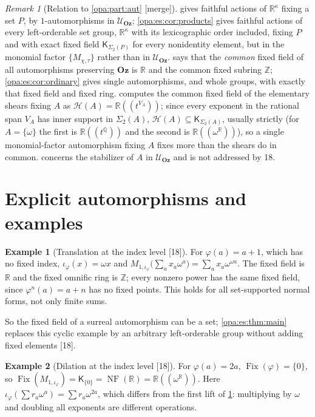 \documentclass[11pt,oneside]{article}
\numberwithin{equation}{section}
\theoremstyle{definition}
\newtheorem{example}[example]{Example}
\theoremstyle{remark}
\newtheorem{remark}[remark]{Remark}
\newcommand{\Oz}{\mathbf{Oz}}
\newcommand{\R}{\mathbb R}
\newcommand{\Q}{\mathbb Q}
\newcommand{\Z}{\mathbb Z}
\newcommand{\UU}{\mathcal U}
\newcommand{\HH}{\mathcal H}
\newcommand{\Fix}{\operatorname{Fix}}
\newcommand{\Hahn}[2]{#1((t^{#2}))}
\newcommand{\src}[1]{\textup{\textsf{\small[#1]}}}
\newcommand{\mergetag}{\textup{\textsf{\small[merge]}}}
\newcommand{\NF}{\operatorname{NF}}
\begin{document}
\begin{remark}[Relation to \cref{opa:part:aut} \mergetag]\label{opa:es:rem:relation}
 gives faithful actions of $\R^\kappa$ fixing a set $P$, by $1$-automorphisms in $\UU_\Oz$; \cref{opa:es:cor:products}
gives faithful actions of every left-orderable set group, $\R^\kappa$ with its lexicographic order included, fixing $P$ and with exact
fixed field $\mathsf K_{\Sigma_2(P)}$ for every nonidentity element, but in the monomial factor $\{M_{\chi,\tau}\}$ rather than in $\UU_\Oz$.
 says that the \emph{common} fixed field of all automorphisms preserving $\Oz$ is $\R$ and the common fixed subring $\Z$;
\cref{opa:es:cor:ordinary} gives single automorphisms, and whole groups, with exactly that fixed field and fixed ring. 
computes the common fixed field of the elementary shears fixing $A$ as $\HH(A)=\Hahn\R{V_A}$; since every exponent in the rational span
$V_A$ has inner support in $\Sigma_2(A)$, $\HH(A)\subseteq\mathsf K_{\Sigma_2(A)}$, usually strictly (for $A=\{\omega\}$ the first is
$\Hahn\R\Q$ and the second is $\R((\omega^\R))$), so a single monomial-factor automorphism fixing $A$ fixes more than the shears do in
common.  concerns the stabilizer of $A$ in $\UU_\Oz$ and is not addressed by 18.
\end{remark}

\section{Explicit automorphisms and examples}\label{opa:es:sec:examples}

\begin{example}[Translation at the index level \src{18}]\label{opa:es:ex:translation}
For $\varphi(a)=a+1$, which has no fixed index, $\iota_\varphi(x)=\omega x$ and
$M_{1,\iota_\varphi}\bigl(\sum_ax_a\omega^a\bigr)=\sum_ax_a\omega^{\omega a}$. The fixed field is $\R$ and the fixed omnific ring is $\Z$; every
nonzero power has the same fixed field, since $\varphi^n(a)=a+n$ has no fixed points. This holds for all set-supported normal forms, not
only finite sums.
\end{example}

So the fixed field of a surreal automorphism can be a set; \cref{opa:es:thm:main} replaces this cyclic example by an arbitrary
left-orderable group without adding fixed elements \src{18}.

\begin{example}[Dilation at the index level \src{18}]\label{opa:es:ex:dilation}
For $\varphi(a)=2a$, $\Fix(\varphi)=\{0\}$, so $\Fix(M_{1,\iota_\varphi})=\mathsf K_{\{0\}}=\NF(\R)=\R((\omega^\R))$. Here
$\iota_\varphi(\sum r_a\omega^a)=\sum r_a\omega^{2a}$, which differs from the first lift of \cref{opa:es:ex:translation}: multiplying by $\omega$ and
doubling all exponents are different operations.
\end{example}
\end{document}
